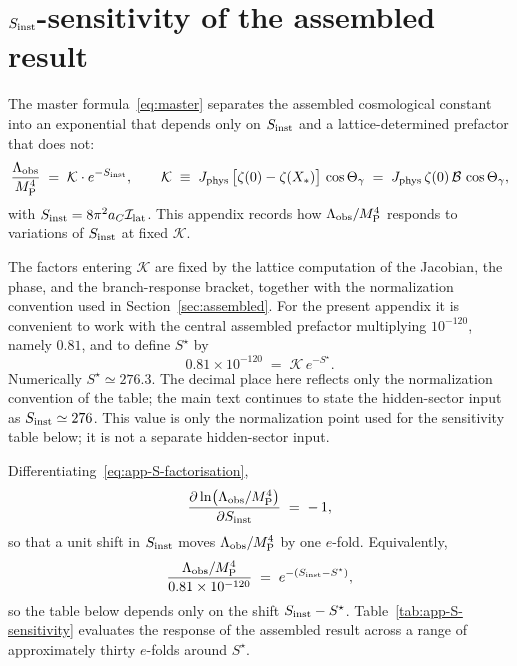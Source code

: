 \documentclass[a4paper,11pt]{article}
\theoremstyle{definition}
\newcommand{\MP}{M_{\rm P}}
\newcommand{\Lobs}{\Lambda_{\rm obs}}
\newcommand{\Ilat}{\mathcal{I}_{\rm lat}}
\newcommand{\Jphys}{J_{\rm phys}}
\newcommand{\Bobs}{\mathcal{B}}
\begin{document}
\section{$S_{\rm inst}$-sensitivity of the assembled result}
\label{app:S-sensitivity}

The master formula~\eqref{eq:master} separates the assembled
cosmological constant into an exponential that depends only on
$S_{\rm inst}$ and a lattice-determined prefactor that does not:
\begin{equation}
\frac{\Lobs}{\MP^4} \;=\; \mathcal{K}\cdot e^{-S_{\rm inst}},
\qquad
\mathcal{K}
\;\equiv\;
\Jphys\,\bigl[\zeta(0) - \zeta(X_*)\bigr]\,\cos\Theta_\gamma
\;=\;
\Jphys\,\zeta(0)\,\Bobs\,\cos\Theta_\gamma,
\label{eq:app-S-factorisation}
\end{equation}
with $S_{\rm inst} = 8\pi^2 a_C \Ilat$. This appendix records how
$\Lobs/\MP^4$ responds to variations of $S_{\rm inst}$ at fixed
$\mathcal{K}$.

The factors entering $\mathcal{K}$ are fixed by the lattice computation
of the Jacobian, the phase, and the branch-response bracket, together
with the normalization convention used in
Section~\ref{sec:assembled}. For the present appendix it is convenient
to work with the central assembled prefactor multiplying $10^{-120}$,
namely $0.81$, and to define $S^\star$ by
\begin{equation}
0.81 \times 10^{-120} \;=\; \mathcal{K}\,e^{-S^\star}.
\label{eq:app-Sstar-def}
\end{equation}
Numerically $S^\star \simeq 276.3$. The decimal place here reflects
only the normalization convention of the table; the main text
continues to state the hidden-sector input as
$S_{\rm inst} \simeq 276$. This value is only the normalization point
used for the sensitivity table below; it is not a separate
hidden-sector input.

Differentiating~\eqref{eq:app-S-factorisation},
\begin{equation}
\frac{\partial \ln\bigl(\Lobs/\MP^4\bigr)}{\partial S_{\rm inst}}
\;=\; -\,1,
\label{eq:app-S-sensitivity}
\end{equation}
so that a unit shift in $S_{\rm inst}$ moves $\Lobs/\MP^4$ by one
$e$-fold. Equivalently,
\[
\frac{\Lobs/\MP^4}{0.81\times 10^{-120}}
\;=\;
e^{-(S_{\rm inst} - S^\star)},
\]
so the table below depends only on the shift
$S_{\rm inst} - S^\star$. Table~\ref{tab:app-S-sensitivity} evaluates
the response of the assembled result across a range of approximately thirty $e$-folds around $S^\star$.
\end{document}
